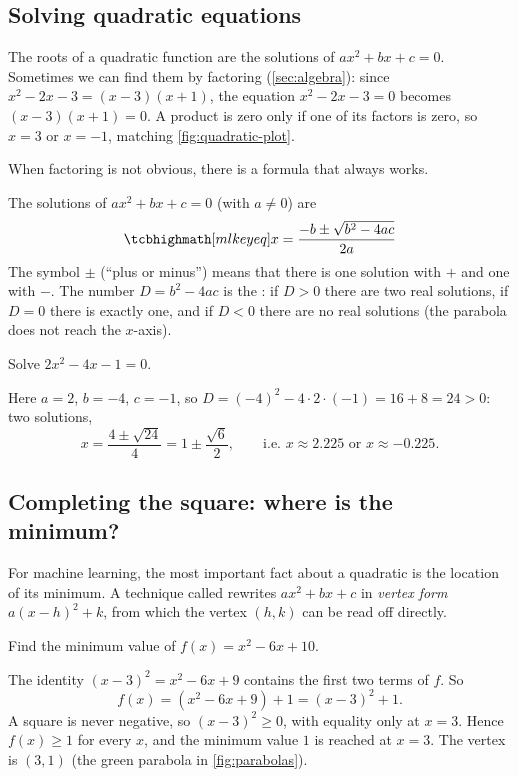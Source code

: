 \subsection{Solving quadratic equations}

The roots of a quadratic function are the solutions of $ax^2 + bx + c = 0$.
Sometimes we can find them by factoring (\cref{sec:algebra}): since
$x^2 - 2x - 3 = (x - 3)(x + 1)$, the equation $x^2 - 2x - 3 = 0$ becomes
$(x - 3)(x + 1) = 0$. A product is zero only if one of its factors is zero, so
$x = 3$ or $x = -1$, matching \cref{fig:quadratic-plot}.

When factoring is not obvious, there is a formula that always works.

\begin{theorem}\label{thm:quadratic-formula}
The solutions of $ax^2 + bx + c = 0$ (with $a \neq 0$) are
\[
  \keyeq{x = \frac{-b \pm \sqrt{b^2 - 4ac}}{2a}}
\]
The symbol $\pm$ (``plus or minus'') means that there is one solution with $+$
and one with $-$. The number $D = b^2 - 4ac$ is the
: if $D > 0$ there are two real solutions, if $D = 0$
there is exactly one, and if $D < 0$ there are no real solutions (the
parabola does not reach the $x$-axis).
\end{theorem}

\begin{example}
Solve $2x^2 - 4x - 1 = 0$.

\sol Here $a = 2$, $b = -4$, $c = -1$, so $D = (-4)^2 - 4\cdot2\cdot(-1) = 16 +
8 = 24 > 0$: two solutions,
\[
  x = \frac{4 \pm \sqrt{24}}{4} = 1 \pm \frac{\sqrt{6}}{2},
  \qquad\text{i.e. } x \approx 2.225 \text{ or } x \approx -0.225 .
\]
\end{example}

\subsection{Completing the square: where is the minimum?}

For machine learning, the most important fact about a quadratic is the
location of its minimum. A technique called 
rewrites $ax^2 + bx + c$ in \emph{vertex form} $a(x - h)^2 + k$, from which the
vertex $(h, k)$ can be read off directly.

\begin{example}\label{ex:complete-square}
Find the minimum value of $f(x) = x^2 - 6x + 10$.

\sol The identity $(x - 3)^2 = x^2 - 6x + 9$ contains the first two terms of
$f$. So
\[
  f(x) = (x^2 - 6x + 9) + 1 = (x-3)^2 + 1 .
\]
A square is never negative, so $(x - 3)^2 \ge 0$, with equality only at
$x = 3$. Hence $f(x) \ge 1$ for every $x$, and the minimum value $1$ is
reached at $x = 3$. The vertex is $(3, 1)$ (the green parabola in
\cref{fig:parabolas}).
\end{example}

